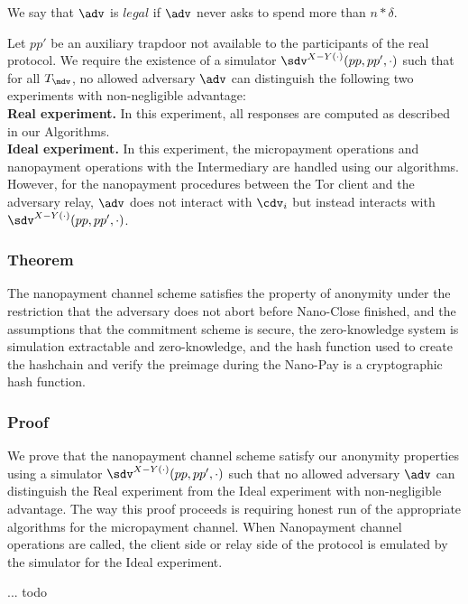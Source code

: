 We say that $\adv$ is $legal$ if $\adv$ never asks to spend more than $n*\delta$.

Let $pp'$ be an auxiliary trapdoor not available to the participants of the real protocol. We require the existence of a simulator $\sdv^{X-Y(\cdot)}(pp, pp', \cdot)$ such that for all $T_\mdv$, no allowed adversary $\adv$ can distinguish the following two experiments with non-negligible advantage:\\
\textbf{Real experiment.} In this experiment, all responses are computed as described in our Algorithms.\\
\textbf{Ideal experiment.} In this experiment, the micropayment operations and nanopayment operations with the Intermediary are handled using our algorithms. However, for the nanopayment procedures between the Tor client and the adversary relay, $\adv$ does not interact with $\cdv_i$ but instead interacts with $\sdv^{X-Y(\cdot)}(pp,pp',\cdot)$.

\subsubsection{Theorem}
The nanopayment channel scheme satisfies the property of anonymity under the restriction that the adversary does not abort before Nano-Close finished, and the assumptions that the commitment scheme is secure, the zero-knowledge system is simulation extractable and zero-knowledge, and the hash function used to create the hashchain and verify the preimage during the Nano-Pay is a cryptographic hash function.

\subsubsection{Proof}

We prove that the nanopayment channel scheme satisfy our anonymity properties using a simulator $\sdv^{X-Y(\cdot)}(pp,pp',\cdot)$ such that no allowed adversary $\adv$ can distinguish the Real experiment from the Ideal experiment with non-negligible advantage. The way this proof proceeds is requiring honest run of the appropriate algorithms for the micropayment channel. When Nanopayment channel operations are called, the client side or relay side of the protocol is emulated by the simulator for the Ideal experiment.

... todo
